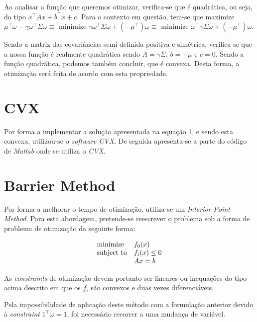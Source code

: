 \documentclass[a4paper]{IEEEtran}
\begin{document}
Ao analisar a função que queremos otimizar, verifica-se que é quadrática, ou seja, do tipo $x^\top Ax+b^\top x+c$.
Para o contexto em questão, tem-se que maximize $\mu^\top \omega - \gamma \omega^\top \Sigma \omega \equiv$ minimize $\gamma \omega^\top \Sigma \omega + (- \mu^\top) \omega \equiv$ minimize $\omega^\top \gamma \Sigma \omega + (- \mu^\top) \omega$.

Sendo a matriz das covariâncias semi-definida positiva e simétrica, verifica-se que a nossa função é realmente quadrática sendo $A = \gamma \Sigma$, $b = -\mu$ e $c=0$. Sendo a função quadrática, podemos também concluir, que é convexa. Desta forma, a otimização será feita de acordo com esta propriedade.

\section{CVX}
\label{sec:cvx}
Por forma a implementar a solução apresentada na equação 1, e sendo esta convexa, utilizou-se o \textit{software CVX}\cite{CVX}. De seguida apresenta-se a parte do código de \textit{Matlab} onde se utiliza o \textit{CVX}.



\section{Barrier Method}
\label{sec:barrier-method}

Por forma a melhorar o tempo de otimização, utiliza-se um \textit{Interior Point Method}. Para esta abordagem, pretende-se reescrever o problema sob a forma de problema de otimização da seguinte forma:

\begin{equation}
\label{eq.ineq}
\begin{array}[t]{ll} \text{minimize} & f_0(x) \\
\text{subject to} & f_i(x) \leq 0 \\ &  Ax=b \end{array}
\end{equation}

As \textit{constraints} de otimização devem portanto ser lineares ou inequações do tipo acima descrito em que os $f_i$ são convexos e duas vezes diferenciáveis.

Pela impossibilidade de aplicação deste método com a formulação anterior devido à \textit{constraint} \: $1^\top\omega=1$, foi necessário recorrer a uma mudança de variável.
\end{document}
